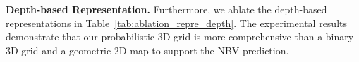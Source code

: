     \vspace{-2pt}
    \begin{table}[h!]
        \huge
        \center
        \setlength{\tabcolsep}{12pt}
        \renewcommand{\arraystretch}{1.5}
        \caption{Ablation studies of depth-based representations on unseen Houses3K test set, where depth map is the only sensory source.}
        \label{tab:ablation_repre_depth}
    \end{table}

    \vspace{1pt}
    \noindent\textbf{Depth-based Representation.}
    Furthermore, we ablate the depth-based representations in Table~\ref{tab:ablation_repre_depth}. The experimental results demonstrate that our probabilistic 3D grid is more comprehensive than a binary 3D grid and a geometric 2D map to support the NBV prediction. 


